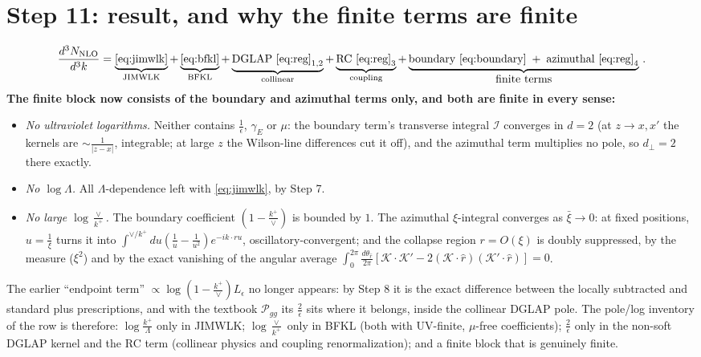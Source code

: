 \documentclass[9pt]{article}
\newcommand{\Leps}{L_{\epsilon}}
\begin{document}
\section{Step 11: result, and why the finite terms are finite}
\begin{align}
\frac{d^{3}N_{\rm NLO}}{d^{3}k}
=\underbrace{\eqref{eq:jimwlk}}_{\rm JIMWLK}
+\underbrace{\eqref{eq:bfkl}}_{\rm BFKL}
+\underbrace{\rm DGLAP\ \eqref{eq:reg}_{1,2}}_{\rm collinear}
+\underbrace{\rm RC\ \eqref{eq:reg}_{3}}_{\rm coupling}
+\underbrace{\rm boundary\ \eqref{eq:boundary}\;+\;azimuthal\ \eqref{eq:reg}_{4}}_{\textstyle\rm finite\ terms}\,.
\end{align}
\textbf{The finite block now consists of the boundary and azimuthal terms only, and both are
finite in every sense:}
\begin{itemize}
\item[(i)] \emph{No ultraviolet logarithms.} Neither contains $\frac{1}{\epsilon}$,
$\gamma_{E}$ or $\mu$: the boundary term's transverse integral $\mathcal I$ converges in
$d=2$ (at $z\to x,x'$ the kernels are $\sim\frac{1}{|z-x|}$, integrable; at large $z$ the
Wilson-line differences cut it off), and the azimuthal term multiplies no pole, so
$d_{\perp}=2$ there exactly.
\item[(ii)] \emph{No $\log\Lambda$.} All $\Lambda$-dependence left with
\eqref{eq:jimwlk}, by Step 7.
\item[(iii)] \emph{No large $\log\frac{\vee}{k^{+}}$.} The boundary coefficient
$(1-\frac{k^{+}}{\vee})$ is bounded by $1$. The azimuthal $\xi$-integral converges as
$\bar\xi\to0$: at fixed positions, $u=\frac1\xi$ turns it into
$\int^{\vee/k^{+}}du(\frac1u-\frac{1}{u^{2}})e^{-ik\cdot ru}$, oscillatory-convergent; and the
collapse region $r=O(\xi)$ is doubly suppressed, by the measure ($\xi^{2}$) and by the exact
vanishing of the angular average
$\int_{0}^{2\pi}\frac{d\theta_{\hat r}}{2\pi}[\mathcal K\!\cdot\!\mathcal K'-2(\mathcal K\!\cdot\!\hat r)(\mathcal K'\!\cdot\!\hat r)]=0$.
\end{itemize}
The earlier ``endpoint term'' $\propto\log(1-\frac{k^{+}}{\vee})\Leps$ no longer appears: by
Step 8 it is the exact difference between the locally subtracted and standard plus
prescriptions, and with the textbook $\mathcal P_{gg}$ its $\frac{2}{\epsilon}$ sits where it
belongs, inside the collinear DGLAP pole. The pole/log inventory of the row is therefore:
$\log\frac{k^{+}}{\Lambda}$ only in JIMWLK; $\log\frac{\vee}{k^{+}}$ only in BFKL (both with
UV-finite, $\mu$-free coefficients); $\frac{2}{\epsilon}$ only in the non-soft DGLAP kernel
and the RC term (collinear physics and coupling renormalization); and a finite block that is
genuinely finite.
\end{document}
